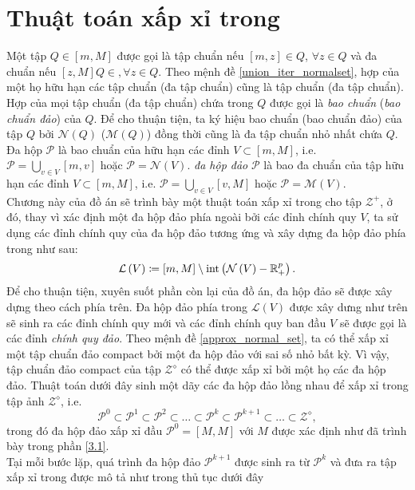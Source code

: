 \section{Thuật toán xấp xỉ trong}
Một tập $Q \in [m, M ]$ được gọi là tập chuẩn nếu
$[m, z] \in Q$, $\forall z \in Q$ và đa chuẩn nếu $[z, M ]  Q\in, \forall z \in Q$. Theo mệnh đề \ref{union_iter_normalset}, hợp của một họ hữu hạn các tập chuẩn (đa tập chuẩn) cũng là tập chuẩn (đa tập chuẩn). Hợp của mọi tập chuẩn (đa tập chuẩn) chứa trong $Q$ được gọi là \textit{bao chuẩn}
(\textit{bao chuẩn đảo}) của $Q$. Để cho thuận tiện, ta ký hiệu bao chuẩn (bao chuẩn đảo) của tập $Q$ bởi $\mathcal{N}\left(Q\right)$ ($\mathcal{M}\left(Q\right)$) đồng thời cũng là đa tập chuẩn nhỏ nhất chứa $Q$. Đa hộp $\mathcal{P}$ là bao chuẩn của hữu hạn các đỉnh $V\subset\left[m,M\right]$, i.e. $\mathcal{P}=\bigcup_{v\in V}\left[m,v\right]$
hoặc $\mathcal{P}=\mathcal{N}\left(V\right).$ \textit{đa hộp đảo} $\mathcal{P}$ là bao đa chuẩn của tập hữu hạn các đỉnh $V\subset\left[m,M\right]$, i.e. $\mathcal{P}=\bigcup_{v\in V}\left[v,M\right]$
hoặc $\mathcal{P}=\mathcal{M}\left(V\right).$\\
\indent Chương này của đồ án sẽ trình bày một thuật toán xấp xỉ trong cho tập $\mathcal{Z}^+$, ở đó, thay vì xác định một đa hộp đảo phía ngoài bởi các đỉnh chính quy $V$, ta sử dụng các đỉnh chính quy của đa hộp đảo tương ứng và xây dựng đa hộp đảo phía trong như sau: 
\[
\mathcal{L}\left(V\right)\coloneqq\left[m,M\right]\setminus{\rm int}\left(\mathcal{N}\left(V\right)-\mathbb{R}_{+}^{p}\right).
\]
Để cho thuận tiện, xuyên suốt phần còn lại của đồ án, đa hộp đảo sẽ được xây dựng theo cách phía trên. Đa hộp đảo phía trong $\mathcal{L}\left(V\right)$
được xây dưng như trên sẽ sinh ra các đỉnh chính quy mới và các đỉnh chính quy ban đầu $V$ sẽ được gọi là các đỉnh \textit{chính quy đảo}. Theo mệnh đề \ref{approx_normal_set}, ta có thể xấp xỉ một tập chuẩn đảo compact bởi một đa hộp đảo với sai số nhỏ bất kỳ. Vì vậy, tập chuẩn đảo compact của tập $\mathcal{Z}^{\diamond}$ có thể được xấp xỉ
bởi một họ các đa hộp đảo. Thuật toán dưới đây sinh một dãy các đa hộp đảo lồng nhau để xấp xỉ trong tập ảnh $\mathcal{Z}^{\diamond}$,
i.e.
\[
\mathcal{P}^{0}\subset\mathcal{P}^{1}\subset\mathcal{P}^{2}\subset\dots\subset\mathcal{P}^{k}\subset\mathcal{P}^{k+1}\subset\dots\subset\mathcal{Z}^{\diamond},
\]
trong đó đa hộp đảo xấp xỉ đầu $\mathcal{P}^{0}=\left[M,M\right]$ với $M$ được xác định như đã trình bày trong phần \ref{3.1}.\\
\indent Tại mỗi bước lặp, quá trình đa hộp đảo $\mathcal{P}^{k+1}$
được sinh ra từ $\mathcal{P}^{k}$ và đưa ra tập xấp xỉ trong 
được mô tả như trong thủ tục dưới đây\\

